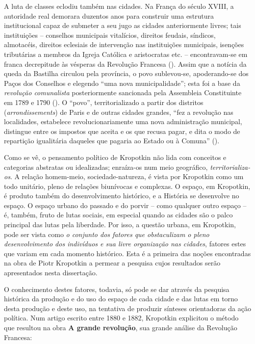 A luta de classes eclodiu também nas cidades. Na França do século XVIII, a autoridade real demorara duzentos anos para construir uma estrutura institucional capaz de submeter a seu jugo as cidades anteriormente livres; tais instituições -- conselhos municipais vitalícios, direitos feudais, síndicos, almotacéis, direitos eclesiais de intervenção nas instituições municipais, isenções tributárias a membros da Igreja Católica e aristocratas etc. -- encontravam-se em franca decrepitude às vésperas da Revolução Francesa (\cite[pp.~118-120]{KROPOTKIN1955}). Assim que a notícia da queda da Bastilha circulou pela província, o povo sublevou-se, apoderando-se dos Paços dos Conselhos e elegendo  ``uma nova municipalidade''; esta foi a base da \textit{revolução comunalista }posteriormente sancionada pela Assembleia Constituinte em 1789 e 1790 (\cite[pp.~121]{KROPOTKIN1955}). O ``povo'', territorializado a partir dos distritos (\textit{arrondissements}) de Paris e de outras cidades grandes, ``fez a revolução nas localidades, estabelece revolucionariamente uma nova administração municipal, distingue entre os impostos que aceita e os que recusa pagar, e dita o modo de repartição igualitária daqueles que pagaria ao Estado ou à Comuna'' (\cite[p.~130]{KROPOTKIN1955}).

Como se vê, o pensamento político de Kropotkin não lida com conceitos e categorias abstratas ou idealizadas; enraíza-os num meio geográfico, \textit{territorializa-os}. A relação homem-meio, sociedade-natureza, é vista por Kropotkin como um todo unitário, pleno de relações biunívocas e complexas. O espaço, em Kropotkin, é produto também do desenvolvimento histórico, e a História se desenvolve no espaço. O espaço urbano do passado e do porvir -- como qualquer outro espaço -- é, também, fruto de lutas sociais, em especial quando as cidades são o palco principal das lutas pela liberdade. Por isso, a questão urbana, em Kropotkin, pode ser vista como \textit{o conjunto dos fatores que obstaculizam o pleno desenvolvimento dos indivíduos e sua livre organização nas cidades}, fatores estes que variam em cada momento histórico. Esta é a primeira das noções encontradas na obra de Piotr Kropotkin a permear a pesquisa cujos resultados serão apresentados nesta dissertação.

O conhecimento destes fatores, todavia, só pode se dar através da pesquisa histórica da produção e do uso do espaço de cada cidade e das lutas em torno desta produção e deste uso, na tentativa de produzir sínteses orientadoras da ação política. Num artigo escrito entre 1880 e 1882, Kropotkin explicitou o método que resultou na obra \textbf{A grande revolução}, sua grande análise da Revolução Francesa: 

